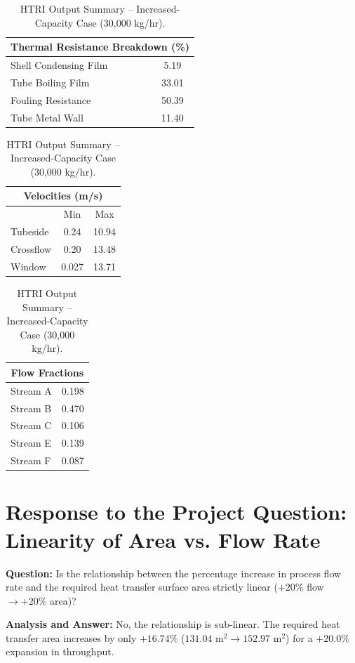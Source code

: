 \documentclass[12pt]{article}
\begin{document}
\begin{table}[H]
\centering
\small
\begin{tabular}{lc}
\toprule
\multicolumn{2}{c}{\textbf{Thermal Resistance Breakdown (\%)}} \\
\midrule
Shell Condensing Film & 5.19 \\
Tube Boiling Film & 33.01 \\
Fouling Resistance & 50.39 \\
Tube Metal Wall & 11.40 \\
\bottomrule
\end{tabular}
\qquad
\begin{tabular}{lcc}
\toprule
\multicolumn{3}{c}{\textbf{Velocities (m/s)}} \\
\midrule
  & Min & Max \\
Tubeside & 0.24 & 10.94 \\
Crossflow & 0.20 & 13.48 \\
Window & 0.027 & 13.71 \\
\bottomrule
\end{tabular}
\qquad
\begin{tabular}{lc}
\toprule
\multicolumn{2}{c}{\textbf{Flow Fractions}} \\
\midrule
Stream A & 0.198 \\
Stream B & 0.470 \\
Stream C & 0.106 \\
Stream E & 0.139 \\
Stream F & 0.087 \\
\bottomrule
\end{tabular}
\caption{HTRI Output Summary -- Increased-Capacity Case (30{,}000 kg/hr).}
\label{tab:expanded_output_summary}
\end{table}

\section{Response to the Project Question: Linearity of Area vs. Flow Rate}

\textbf{Question:} Is the relationship between the percentage increase in process flow rate and the required heat transfer surface area strictly linear ($+20\%$ flow $\to +20\%$ area)?

\textbf{Analysis and Answer:} No, the relationship is sub-linear. The required heat transfer area increases by only $+16.74\%$ ($131.04\text{ m}^2 \to 152.97\text{ m}^2$) for a $+20.0\%$ expansion in throughput.
\end{document}
